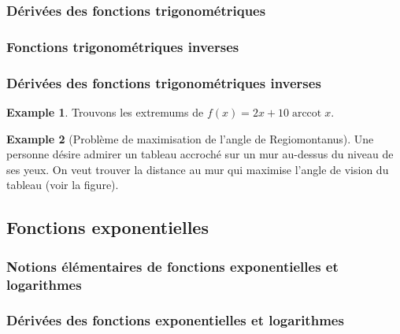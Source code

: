 \documentclass[12pt]{article}
\theoremstyle{definition}
\newtheorem{ex}{Example}
\theoremstyle{remark}
\newcommand{\arccot}{\operatorname{arccot}}
\begin{document}
\subsubsection{Dérivées des fonctions trigonométriques}

\subsubsection{Fonctions trigonométriques inverses}

\subsubsection{Dérivées des fonctions trigonométriques inverses}

\begin{ex}
    Trouvons les extremums de $f(x) = 2x +10\arccot x$.
\end{ex}
\begin{ex}[Problème de maximisation de l'angle de Regiomontanus]
    Une personne désire admirer un tableau accroché sur un mur au-dessus du niveau de ses yeux. On veut trouver la distance au mur qui maximise l'angle de vision du tableau (voir la figure).
\end{ex}
\subsection{Fonctions exponentielles}

\subsubsection{Notions élémentaires de fonctions exponentielles et logarithmes}

\subsubsection{Dérivées des fonctions exponentielles et logarithmes}
\end{document}
